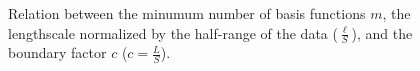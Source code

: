 \documentclass[]{interact}
\theoremstyle{plain}%
\theoremstyle{definition}
\theoremstyle{remark}
\begin{document}
\begin{figure}[H]
\centering
{}
\caption{Relation between the minumum number of basis functions $m$, the lengthscale normalized by the half-range of the data ($\frac{\ell}{S}$), and the boundary factor $c$ ($c = \frac{L}{S}$).}
  \label{fig3_lscale_vs_J_vs_c_part1}
\end{figure}
\end{document}
